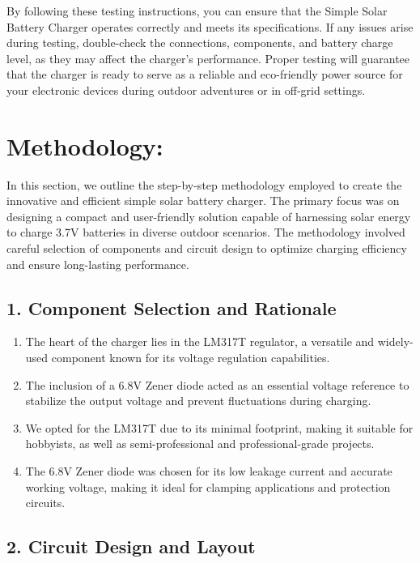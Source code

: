 \documentclass[twocolumn]{article}
\begin{document}
By following these testing instructions, you can ensure that the Simple Solar Battery Charger operates correctly and meets its specifications. If any issues arise during testing, double-check the connections, components, and battery charge level, as they may affect the charger's performance. Proper testing will guarantee that the charger is ready to serve as a reliable and eco-friendly power source for your electronic devices during outdoor adventures or in off-grid settings.

\section*{Methodology:}
In this section, we outline the step-by-step methodology employed to create the innovative and efficient simple solar battery charger. The primary focus was on designing a compact and user-friendly solution capable of harnessing solar energy to charge 3.7V batteries in diverse outdoor scenarios. The methodology involved careful selection of components and circuit design to optimize charging efficiency and ensure long-lasting performance.

\subsection*{1. Component Selection and Rationale}

\begin{enumerate}
  \item The heart of the charger lies in the LM317T regulator, a versatile and widely-used component known for its voltage regulation capabilities.
  \item The inclusion of a 6.8V Zener diode acted as an essential voltage reference to stabilize the output voltage and prevent fluctuations during charging.
  \item We opted for the LM317T due to its minimal footprint, making it suitable for hobbyists, as well as semi-professional and professional-grade projects.
  \item The 6.8V Zener diode was chosen for its low leakage current and accurate working voltage, making it ideal for clamping applications and protection circuits.
\end{enumerate}

\subsection*{2. Circuit Design and Layout}
\end{document}
